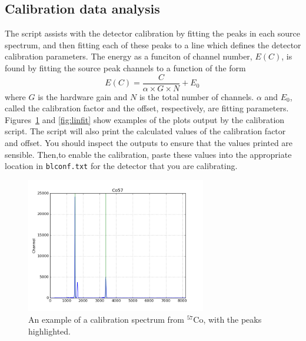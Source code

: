 \subsection{Calibration data analysis}

The script  assists with the detector
calibration by fitting the peaks in each source spectrum, and then
fitting each of these peaks to a line which defines the detector
calibration parameters. The energy as a funciton of channel number,
$E(C)$, is found by fitting the source peak channels to a function of
the form
\begin{equation}
  \label{eq:calib-lin}
  E(C) = \frac{ C }{ \alpha \times G \times N } + E_0 \,
\end{equation}
where $G$ is the hardware gain and $N$ is the total number of channels. $\alpha$
and $E_0$, called the calibration factor and the offset, respectively, are
fitting parameters. Figures~\ref{fig:co57} and \ref{fig:linfit} show examples of
the plots output by the calibration script. The script will also print the
calculated values of the calibration factor and offset. You should inspect the
outputs to ensure that the values printed are sensible. Then,to enable the
calibration, paste these values into the appropriate location in
\texttt{blconf.txt} for the detector that you are calibrating. 

\begin{figure}
  \centering
  \includegraphics[width=0.7\textwidth]{Co57.png}
  \caption{\label{fig:co57} An example of a calibration spectrum from $^{57}$Co,
    with the peaks highlighted.}
\end{figure}

